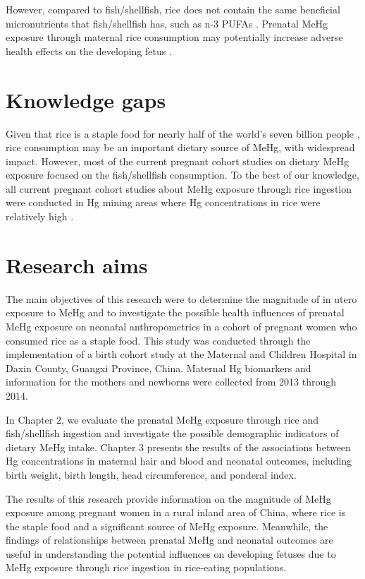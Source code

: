 However, compared to fish/shellfish, rice does not contain the same beneficial micronutrients that fish/shellfish has, such as n-3 PUFAs \citep{rothenberg2011low}. Prenatal MeHg exposure through maternal rice consumption may potentially increase adverse health effects on the developing fetus \citep{rothenberg2011low}.

\section{Knowledge gaps}

Given that rice is a staple food for nearly half of the world's seven billion people \citep{mohanty2013trends}, rice consumption may be an important dietary source of MeHg, with widespread impact. However, most of the current pregnant cohort studies on dietary MeHg exposure focused on the fish/shellfish consumption. To the best of our knowledge, all current pregnant cohort studies about MeHg exposure through rice ingestion were conducted in Hg mining areas where Hg concentrations in rice were relatively high \citep{morishita1982mercury,rothenberg2013prenatal}. 

\section{Research aims}

The main objectives of this research were to determine the magnitude of in utero exposure to MeHg and to investigate the possible health influences of prenatal MeHg exposure on neonatal anthropometrics in a cohort of pregnant women who consumed rice as a staple food. This study was conducted through the implementation of a birth cohort study at the Maternal and Children Hospital in Daxin County, Guangxi Province, China. Maternal Hg biomarkers and information for the mothers and newborns were collected from 2013 through 2014.

In Chapter 2, we evaluate the prenatal MeHg exposure through rice and fish/shellfish ingestion and investigate the possible demographic indicators of dietary MeHg intake. Chapter 3 presents the results of the associations between Hg concentrations in maternal hair and blood and neonatal outcomes, including birth weight, birth length, head circumference, and ponderal index.

The results of this research provide information on the magnitude of MeHg exposure among pregnant women in a rural inland area of China, where rice is the staple food and a significant source of MeHg exposure. Meanwhile, the findings of relationships between prenatal MeHg and neonatal outcomes are useful in understanding the potential influences on developing fetuses due to MeHg exposure through rice ingestion in rice-eating populations. 


